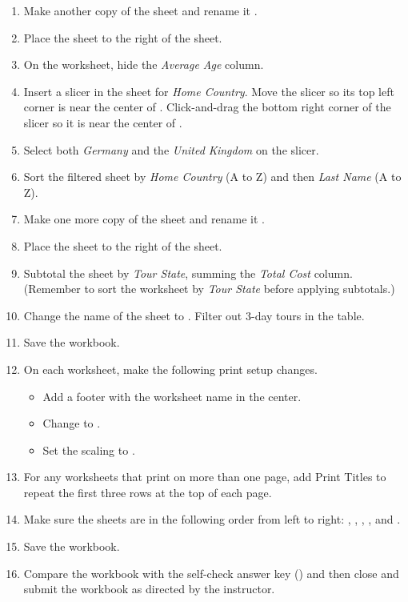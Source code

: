 \begin{enumbox}
\begin{enumerate}
		\item Make another copy of the  sheet and rename it . 
		\item Place the  sheet to the right of the  sheet. 
		\item On the  worksheet, hide the \textit{Average Age} column.
		\item Insert a slicer in the  sheet for \textit{Home Country}. Move the slicer so its top left corner is near the center of . Click-and-drag the bottom right corner of the slicer so it is near the center of .
		\item Select both \textit{Germany} and the \textit{United Kingdom} on the slicer.
		\item Sort the filtered sheet by \textit{Home Country} (A to Z) and then \textit{Last Name} (A to Z).
	
		\item Make one more copy of the  sheet and rename it .
		\item Place the  sheet to the right of the  sheet. 
		\item Subtotal the sheet by \textit{Tour State}, summing the \textit{Total Cost} column. (Remember to sort the worksheet by \textit{Tour State} before applying subtotals.)
		\item Change the name of the  sheet to . Filter out $ 3 $-day tours in the table.
		\item Save the  workbook.
		\item On each worksheet, make the following print setup changes.
	
		\begin{itemize}
			\item Add a footer with the worksheet name in the center.
			\item Change to .
			\item Set the scaling to .
		\end{itemize}
	
		\item For any worksheets that print on more than one page, add Print Titles to repeat the first three rows at the top of each page.
		\item Make sure the sheets are in the following order from left to right: , , , , and .
		\item Save the  workbook.
		\item Compare the workbook with the self-check answer key () and then close and submit the  workbook as directed by the instructor.
	

\end{enumerate}
\end{enumbox}
